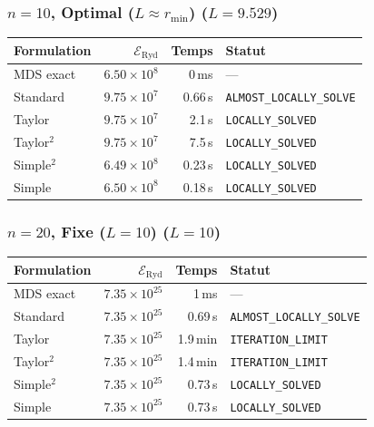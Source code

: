 \subsubsection{$n=10$, Optimal ($L{\approx}r_{\min}$) ($L=9.529$)}
\begin{longtable}{@{}lrrl@{}}
  \toprule
  Formulation & $\mathcal{E}_{\mathrm{Ryd}}$ & Temps & Statut \\
  \midrule
  \endhead
  MDS exact & $6.50\times10^{8}$ & 0\,ms & --- \\
  Standard & $9.75\times10^{7}$ & 0.66\,s & \texttt{ALMOST\_LOCALLY\_SOLVE} \\
  Taylor & $9.75\times10^{7}$ & 2.1\,s & \texttt{LOCALLY\_SOLVED} \\
  Taylor$^2$ & $9.75\times10^{7}$ & 7.5\,s & \texttt{LOCALLY\_SOLVED} \\
  Simple$^2$ & $6.49\times10^{8}$ & 0.23\,s & \texttt{LOCALLY\_SOLVED} \\
  Simple & $6.50\times10^{8}$ & 0.18\,s & \texttt{LOCALLY\_SOLVED} \\
  \bottomrule
\end{longtable}

\subsubsection{$n=20$, Fixe ($L{=}10$) ($L=10$)}
\begin{longtable}{@{}lrrl@{}}
  \toprule
  Formulation & $\mathcal{E}_{\mathrm{Ryd}}$ & Temps & Statut \\
  \midrule
  \endhead
  MDS exact & $7.35\times10^{25}$ & 1\,ms & --- \\
  Standard & $7.35\times10^{25}$ & 0.69\,s & \texttt{ALMOST\_LOCALLY\_SOLVE} \\
  Taylor & $7.35\times10^{25}$ & 1.9\,min & \texttt{ITERATION\_LIMIT} \\
  Taylor$^2$ & $7.35\times10^{25}$ & 1.4\,min & \texttt{ITERATION\_LIMIT} \\
  Simple$^2$ & $7.35\times10^{25}$ & 0.73\,s & \texttt{LOCALLY\_SOLVED} \\
  Simple & $7.35\times10^{25}$ & 0.73\,s & \texttt{LOCALLY\_SOLVED} \\
  \bottomrule
\end{longtable}

